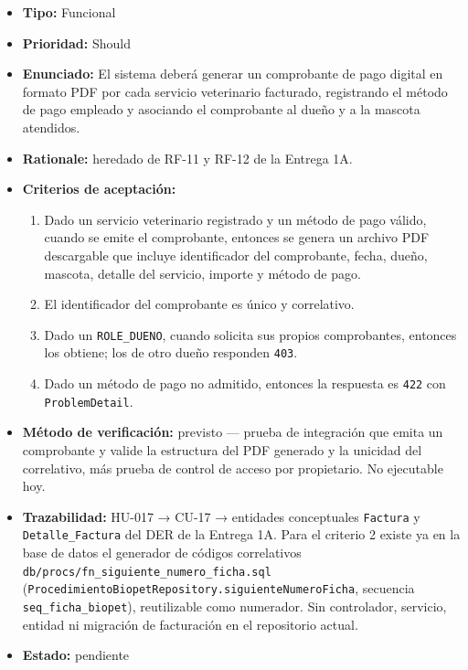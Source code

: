\documentclass[
  spanish,
]{article}
\providecommand{\tightlist}{%
  \setlength{\itemsep}{0pt}\setlength{\parskip}{0pt}}
\begin{document}
\begin{itemize}
\tightlist
\item
  \textbf{Tipo:} Funcional
\item
  \textbf{Prioridad:} Should
\item
  \textbf{Enunciado:} El sistema deberá generar un comprobante de pago
  digital en formato PDF por cada servicio veterinario facturado,
  registrando el método de pago empleado y asociando el comprobante al
  dueño y a la mascota atendidos.
\item
  \textbf{Rationale:} heredado de RF-11 y RF-12 de la Entrega 1A.
\item
  \textbf{Criterios de aceptación:}

  \begin{enumerate}
  \def\labelenumi{\arabic{enumi}.}
  \tightlist
  \item
    Dado un servicio veterinario registrado y un método de pago válido,
    cuando se emite el comprobante, entonces se genera un archivo PDF
    descargable que incluye identificador del comprobante, fecha, dueño,
    mascota, detalle del servicio, importe y método de pago.
  \item
    El identificador del comprobante es único y correlativo.
  \item
    Dado un \texttt{ROLE\_\allowbreak{}DUENO}, cuando solicita sus propios
    comprobantes, entonces los obtiene; los de otro dueño responden
    \texttt{403}.
  \item
    Dado un método de pago no admitido, entonces la respuesta es
    \texttt{422} con \texttt{Problem\allowbreak{}Detail}.
  \end{enumerate}
\item
  \textbf{Método de verificación:} previsto --- prueba de integración
  que emita un comprobante y valide la estructura del PDF generado y la
  unicidad del correlativo, más prueba de control de acceso por
  propietario. No ejecutable hoy.
\item
  \textbf{Trazabilidad:} HU-017 → CU-17 → entidades conceptuales
  \texttt{Factura} y \texttt{Detalle\_\allowbreak{}Factura} del DER de la Entrega 1A.
  Para el criterio 2 existe ya en la base de datos el generador de
  códigos correlativos
  \texttt{db/\allowbreak{}procs/\allowbreak{}fn\_\allowbreak{}siguiente\_\allowbreak{}numer\allowbreak{}o\_\allowbreak{}ficha.\allowbreak{}sql}
  (\texttt{Procedimiento\allowbreak{}Biopet\allowbreak{}Repository.\allowbreak{}siguiente\allowbreak{}Numero\allowbreak{}Ficha},
  secuencia \texttt{seq\_\allowbreak{}ficha\_\allowbreak{}biopet}), reutilizable como numerador.
  Sin controlador, servicio, entidad ni migración de facturación en el
  repositorio actual.
\item
  \textbf{Estado:} pendiente
\end{itemize}
\end{document}
